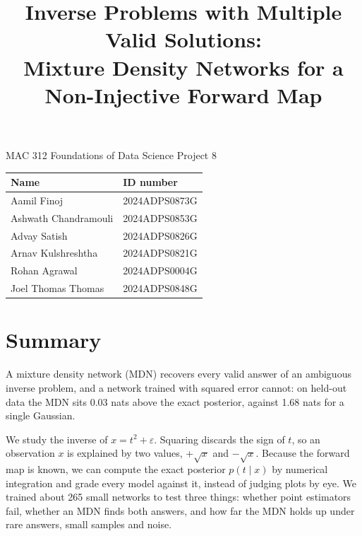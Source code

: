 \documentclass[11pt,a4paper]{article}
\title{\textbf{Inverse Problems with Multiple Valid Solutions:\\[0.2em] Mixture Density Networks for a Non-Injective Forward Map}}
\author{}
\date{}
\begin{document}
\maketitle
\vspace{-2.5em}
\begin{center}\large MAC 312 Foundations of Data Science \textperiodcentered{} Project 8\end{center}

\begin{table}[H]
\centering\small
\begin{tabular}{ll}
\toprule
\textbf{Name} & \textbf{ID number} \\
\midrule
Aamil Finoj & 2024ADPS0873G \\
Ashwath Chandramouli & 2024ADPS0853G \\
Advay Satish & 2024ADPS0826G \\
Arnav Kulshreshtha & 2024ADPS0821G \\
Rohan Agrawal & 2024ADPS0004G \\
Joel Thomas Thomas & 2024ADPS0848G \\
\bottomrule
\end{tabular}
\end{table}

\section*{Summary}
A mixture density network (MDN) recovers every valid answer of an ambiguous inverse problem, and a network trained with squared error cannot: on held-out data the MDN sits 0.03 nats above the exact posterior, against 1.68 nats for a single Gaussian.

We study the inverse of $x = t^{2} + \varepsilon$. Squaring discards the sign of $t$, so an observation $x$ is explained by two values, +$\sqrt{x}$ and $-\sqrt{x}$. Because the forward map is known, we can compute the exact posterior $p(t \mid  x)$ by numerical integration and grade every model against it, instead of judging plots by eye. We trained about 265 small networks to test three things: whether point estimators fail, whether an MDN finds both answers, and how far the MDN holds up under rare answers, small samples and noise.
\end{document}
